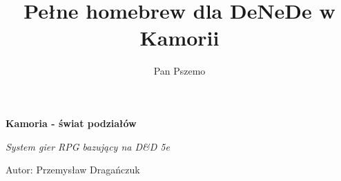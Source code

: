 \documentclass[a4paper,12pt]{scrbook}
\author{Pan Pszemo}
\title{Pełne homebrew dla DeNeDe w Kamorii}
\begin{document}

\begin{titlepage}
	\begin{center}
		\vspace*{1cm}

		{\LARGE\bfseries Kamoria - świat podziałów}

		\vspace{4cm}

		{\large\itshape System gier RPG bazujący na D\&D 5e}

		\vfill

		Autor: Przemysław Dragańczuk

		\vspace*{1cm}

	\end{center}
\end{titlepage}

\tableofcontents








\end{document}
